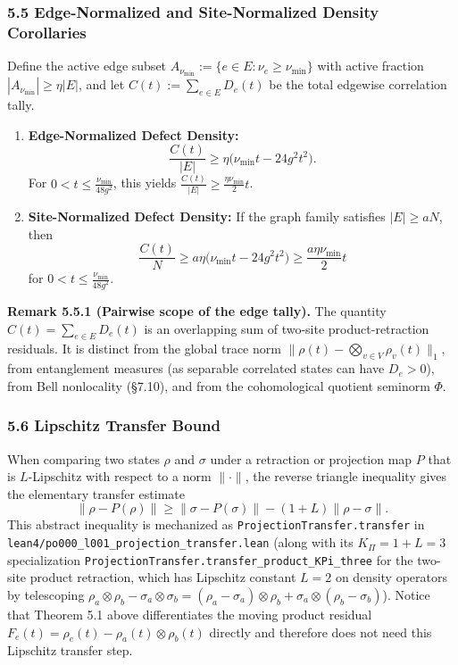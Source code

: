 \documentclass[
  11pt,
]{article}
\begin{document}
\subsubsection{5.5 Edge-Normalized and Site-Normalized Density Corollaries}\label{edge-normalized-and-site-normalized-density-corollaries}

Define the active edge subset \(A_{\nu_{\min}}:=\{e\in E:\nu_e\ge\nu_{\min}\}\) with active fraction \(|A_{\nu_{\min}}|\ge\eta|E|\), and let \(C(t):=\sum_{e\in E}D_e(t)\) be the total edgewise correlation tally.

\begin{enumerate}
\def\labelenumi{\arabic{enumi}.}
\item
  \textbf{Edge-Normalized Defect Density:}
  \[
  \frac{C(t)}{|E|} \ge \eta\bigl(\nu_{\min}t-24g^2t^2\bigr).
  \]
  For \(0 < t \le \frac{\nu_{\min}}{48g^2}\), this yields \(\frac{C(t)}{|E|} \ge \frac{\eta \nu_{\min}}{2} t\).
\item
  \textbf{Site-Normalized Defect Density:}
  If the graph family satisfies \(|E|\ge aN\), then
  \[
  \boxed{
  \frac{C(t)}{N} \ge a\eta\bigl(\nu_{\min}t-24g^2t^2\bigr) \ge \frac{a\eta\nu_{\min}}{2}t
  }
  \]
  for \(0<t\le\frac{\nu_{\min}}{48g^2}\).
\end{enumerate}

\textbf{Remark 5.5.1 (Pairwise scope of the edge tally).} The quantity \(C(t)=\sum_{e\in E}D_e(t)\) is an overlapping sum of two-site product-retraction residuals. It is distinct from the global trace norm \(\lVert\rho(t)-\bigotimes_{v\in V}\rho_v(t)\rVert_1\), from entanglement measures (as separable correlated states can have \(D_e > 0\)), from Bell nonlocality (§7.10), and from the cohomological quotient seminorm \(\Phi\).

\subsubsection{5.6 Lipschitz Transfer Bound}\label{lipschitz-transfer-bound}

When comparing two states \(\rho\) and \(\sigma\) under a retraction or projection map \(P\) that is \(L\)-Lipschitz with respect to a norm \(\lVert\cdot\rVert\), the reverse triangle inequality gives the elementary transfer estimate
\[
\lVert\rho - P(\rho)\rVert \ge \lVert\sigma - P(\sigma)\rVert - (1+L)\lVert\rho-\sigma\rVert.
\]
This abstract inequality is mechanized as \texttt{ProjectionTransfer.transfer} in \texttt{lean4/po000\_l001\_projection\_transfer.lean} (along with its \(K_\Pi = 1+L = 3\) specialization \texttt{ProjectionTransfer.transfer\_product\_KPi\_three} for the two-site product retraction, which has Lipschitz constant \(L=2\) on density operators by telescoping \(\rho_a\otimes\rho_b - \sigma_a\otimes\sigma_b = (\rho_a-\sigma_a)\otimes\rho_b + \sigma_a\otimes(\rho_b-\sigma_b)\)). Notice that Theorem 5.1 above differentiates the moving product residual \(F_e(t)=\rho_e(t)-\rho_a(t)\otimes\rho_b(t)\) directly and therefore does not need this Lipschitz transfer step.
\end{document}
